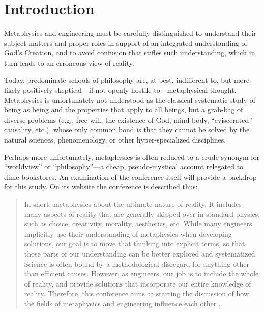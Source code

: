 \section{Introduction}



Metaphysics and engineering must be carefully distinguished to understand their subject matters and proper roles in support of an integrated understanding of God's Creation, and to avoid confusion that stifles such understanding, which in turn leads to an erroneous view of reality.

Today, predominate schools of philosophy are, at best, indifferent to, but more likely positively skeptical---if not openly hostile to---metaphysical thought. Metaphysics is unfortunately not understood as the classical systematic study of being as being and the properties that apply to all beings, but a grab-bag of diverse problems (e.g., free will, the existence of God, mind-body, ``eviscerated'' causality, etc.), whose only common bond is that they cannot be solved by the natural sciences, phenomenology, or other hyper-specialized disciplines.

Perhaps more unfortunately, metaphysics is often reduced to a crude synonym for ``worldview'' or ``philosophy''---a cheap, pseudo-mystical account relegated to dime-bookstores. An examination of the conference itself will provide a backdrop for this study.  On its website the conference is described thus:

\begin{quote}
In short, metaphysics  about the ultimate nature of reality. It includes many aspects of reality that are generally skipped over in standard physics, such as choice, creativity, morality, aesthetics, etc. While many engineers implicitly use their understanding of metaphysics when developing solutions, our goal is to move that thinking into explicit terms, so that those parts of our understanding can be better explored and systematized. Science is often bound by a methodological disregard for anything other than efficient causes. However, as engineers, our job is to include the whole of reality, and provide solutions that incorporate our entire knowledge of reality. Therefore, this conference aims at starting the discussion of how the fields of metaphysics and engineering influence each other \citep{aboutconference}.
\end{quote}

